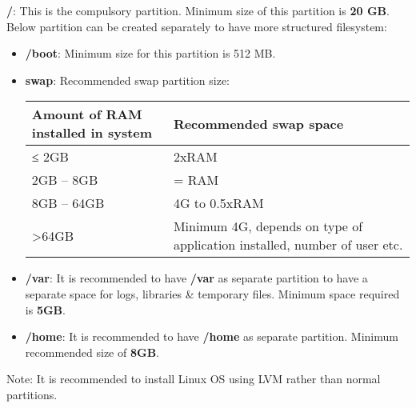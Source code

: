 \setlength{\columnsep}{3pt}
\begin{flushleft}

\bigskip

\textbf{/}: This is the compulsory partition. Minimum size of this partition is \textbf{20 GB}. 
\newline
Below partition can be created separately to have more structured filesystem:
\begin{itemize}
	\item \textbf{/boot}: Minimum size for this partition is 512 MB.
	\item \textbf{swap}: Recommended swap partition size:
	\begin{tabulary}{1.0\textwidth}{|p{10em}|p{10em}|}
		\toprule
		\textbf{Amount of RAM installed in system} & \textbf{Recommended swap space}\\
		\midrule
		≤ 2GB & 2xRAM \\
		\hline
		2GB – 8GB & = RAM \\
		\hline
		8GB – 64GB & 4G to 0.5xRAM \\
		\hline
		>64GB & Minimum 4G, depends on type of application installed, number of user etc.\\
		\bottomrule
	\end{tabulary}
	
	\bigskip\bigskip
	\item \textbf{/var}: It is recommended to have \textbf{/var} as separate partition to have a separate space for logs, libraries \& temporary files. Minimum space required is \textbf{5GB}.
	\item \textbf{/home}: It is recommended to have \textbf{/home} as separate partition. Minimum recommended size of \textbf{8GB}.
	
\end{itemize}
 
 
 \begin{tcolorbox}[breakable,notitle,boxrule=-0pt,colback=yellow,colframe=yellow]
 	\color{black}
 	Note: It is recommended to install Linux OS using LVM rather than normal partitions.
 \end{tcolorbox}
 
 
 

\end{flushleft}
\newpage



